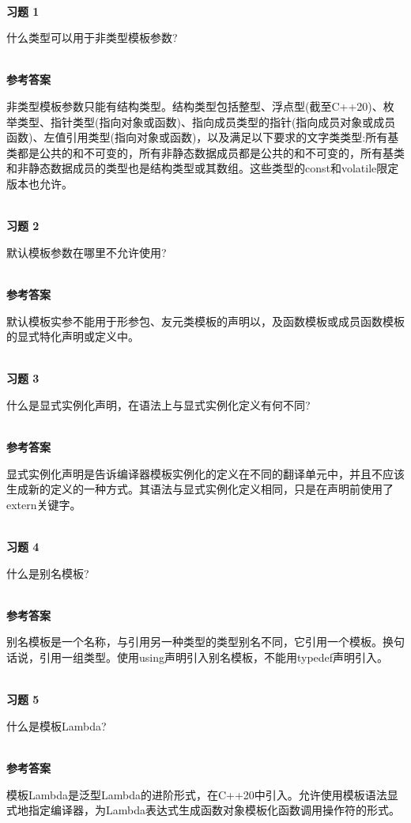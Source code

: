 \hspace*{\fill} \\ %
\noindent
\textbf{习题 1}

什么类型可以用于非类型模板参数?

\hspace*{\fill} \\ %
\noindent
\textbf{参考答案}

非类型模板参数只能有结构类型。结构类型包括整型、浮点型(截至C++20)、枚举类型、指针类型(指向对象或函数)、指向成员类型的指针(指向成员对象或成员函数)、左值引用类型(指向对象或函数)，以及满足以下要求的文字类类型:所有基类都是公共的和不可变的，所有非静态数据成员都是公共的和不可变的，所有基类和非静态数据成员的类型也是结构类型或其数组。这些类型的const和volatile限定版本也允许。


\hspace*{\fill} \\ %
\noindent
\textbf{习题 2}

默认模板参数在哪里不允许使用?

\hspace*{\fill} \\ %
\noindent
\textbf{参考答案}

默认模板实参不能用于形参包、友元类模板的声明以，及函数模板或成员函数模板的显式特化声明或定义中。

\hspace*{\fill} \\ %
\noindent
\textbf{习题 3}

什么是显式实例化声明，在语法上与显式实例化定义有何不同?

\hspace*{\fill} \\ %
\noindent
\textbf{参考答案}

显式实例化声明是告诉编译器模板实例化的定义在不同的翻译单元中，并且不应该生成新的定义的一种方式。其语法与显式实例化定义相同，只是在声明前使用了extern关键字。

\hspace*{\fill} \\ %
\noindent
\textbf{习题 4}

什么是别名模板?

\hspace*{\fill} \\ %
\noindent
\textbf{参考答案}

别名模板是一个名称，与引用另一种类型的类型别名不同，它引用一个模板。换句话说，引用一组类型。使用using声明引入别名模板，不能用typedef声明引入。

\hspace*{\fill} \\ %
\noindent
\textbf{习题 5}

什么是模板Lambda?

\hspace*{\fill} \\ %
\noindent
\textbf{参考答案}

模板Lambda是泛型Lambda的进阶形式，在C++20中引入。允许使用模板语法显式地指定编译器，为Lambda表达式生成函数对象模板化函数调用操作符的形式。












